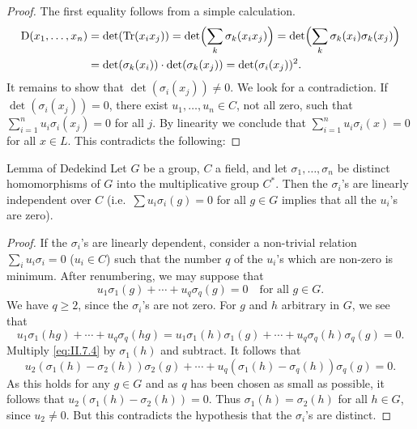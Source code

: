 \begin{proof}
The first equality follows from a simple calculation.
\[
\begin{aligned}
\mathrm{D}(x_{1},\ldots,x_{n})
&=\det(\operatorname{Tr}(x_{i}x_{j}))
=\det\Bigl(\sum_{k}\sigma_{k}(x_{i}x_{j})\Bigr)
=\det\Bigl(\sum_{k}\sigma_{k}(x_{i})\sigma_{k}(x_{j})\Bigr)\\
&=\det(\sigma_{k}(x_{i}))\cdot\det(\sigma_{k}(x_{j}))
=\det(\sigma_{i}(x_{j}))^{2}.
\end{aligned}
\]
It remains to show that $\det(\sigma_{i}(x_{j}))\neq0$. We look for a
contradiction. If $\det(\sigma_{i}(x_{j}))=0$, there exist
$u_{1},\ldots,u_{n}\in C$, not all zero, such that
$\sum_{i=1}^{n}u_{i}\sigma_{i}(x_{j})=0$ for all $j$. By linearity we
conclude that $\sum_{i=1}^{n}u_{i}\sigma_{i}(x)=0$ for all $x\in L$. This
contradicts the following:
\end{proof}

\begin{statement}{Lemma of Dedekind}
Let $G$ be a group, $C$ a field, and let $\sigma_{1},\ldots,\sigma_{n}$ be
distinct homomorphisms of $G$ into the multiplicative group $C^{*}$. Then the
$\sigma_{i}$'s are linearly independent over $C$ (i.e.\
$\sum u_{i}\sigma_{i}(g)=0$ for all $g\in G$ implies that all the
$u_{i}$'s are zero).
\end{statement}

\begin{proof}
If the $\sigma_{i}$'s are linearly dependent, consider a non-trivial
relation $\sum_{i}u_{i}\sigma_{i}=0$ ($u_{i}\in C$) such that the number
$q$ of the $u_{i}$'s which are non-zero is minimum. After renumbering, we may
suppose that
\begin{equation}
u_{1}\sigma_{1}(g)+\cdots+u_{q}\sigma_{q}(g)=0\quad\text{for all }g\in G.
\label{eq:II.7.4}
\end{equation}
We have $q\geq2$, since the $\sigma_{i}$'s are not zero. For $g$ and $h$
arbitrary in $G$, we see that
\begin{equation*}
u_{1}\sigma_{1}(hg)+\cdots+u_{q}\sigma_{q}(hg)
=u_{1}\sigma_{1}(h)\sigma_{1}(g)+\cdots+u_{q}\sigma_{q}(h)\sigma_{q}(g)=0.
\end{equation*}
Multiply \eqref{eq:II.7.4} by $\sigma_{1}(h)$ and subtract. It follows that
\[
u_{2}\left(\sigma_{1}(h)-\sigma_{2}(h)\right)\sigma_{2}(g)+\cdots+
u_{q}\left(\sigma_{1}(h)-\sigma_{q}(h)\right)\sigma_{q}(g)=0.
\]
As this holds for any $g\in G$ and as $q$ has been chosen as small as
possible, it follows that
$u_{2}(\sigma_{1}(h)-\sigma_{2}(h))=0$. Thus
$\sigma_{1}(h)=\sigma_{2}(h)$ for all $h\in G$, since $u_{2}\neq0$. But this
contradicts the hypothesis that the $\sigma_{i}$'s are distinct.
\end{proof}

